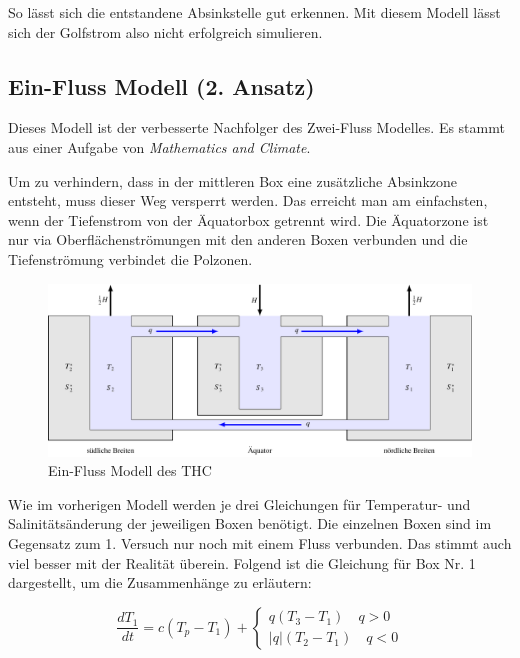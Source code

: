 So lässt sich die entstandene Absinkstelle gut erkennen. 
Mit diesem Modell lässt sich der Golfstrom also nicht erfolgreich simulieren. 

\subsection{Ein-Fluss Modell (2. Ansatz)}\label{thermohalin:3b1f_title}

Dieses Modell ist der verbesserte Nachfolger des Zwei-Fluss Modelles.
Es stammt aus einer Aufgabe von {\em Mathematics and Climate}\cite{skript:kaperengler}.

Um zu verhindern, dass in der mittleren Box eine zusätzliche Absinkzone entsteht, muss dieser Weg versperrt werden. Das erreicht man am einfachsten, wenn der Tiefenstrom von der Äquatorbox getrennt wird. Die Äquatorzone ist nur via Oberflächenströmungen mit den anderen Boxen verbunden und die Tiefenströmung verbindet die Polzonen.


\begin{figure}
	\centering
	\includegraphics[width=14cm]{thermohalin/tikz/3b1f.pdf}
	\caption{Ein-Fluss Modell des THC}
	\label{thermohalin:3b1f}
\end{figure}

Wie im vorherigen Modell werden je drei Gleichungen für Temperatur- und Salinitätsänderung der jeweiligen Boxen benötigt.
Die einzelnen Boxen sind im Gegensatz zum 1. Versuch nur noch  mit einem Fluss verbunden. Das stimmt auch viel besser mit der Realität überein. Folgend ist die Gleichung für Box Nr. 1 dargestellt, um die Zusammenhänge zu erläutern:

\begin{equation}
\frac{dT_1}{dt} = c(T_p-T_1)+ \begin{cases} q(T_3-T_1)  \quad q>0 \\ |q|(T_2-T_1)  \quad q<0 \end{cases}
\end{equation}

